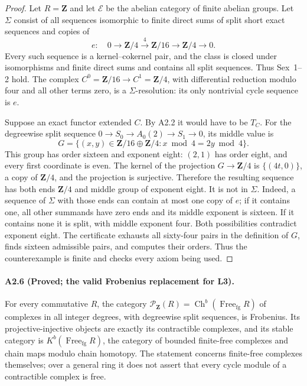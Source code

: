 \begin{proof}
Let $R=\mathbf Z$ and let $\mathcal E$ be the abelian category of
finite abelian groups.  Let $\Sigma$ consist of all sequences
isomorphic to finite direct sums of split short exact sequences and
copies of
\[
 e:\quad 0\longrightarrow\mathbf Z/4\xrightarrow{\,4\,}
 \mathbf Z/16\longrightarrow\mathbf Z/4\longrightarrow0.
\]
Every such sequence is a kernel--cokernel pair, and the class is
closed under isomorphisms and finite direct sums and contains all
split sequences.  Thus Sex~1--2 hold.  The complex
$C^0=\mathbf Z/16\to C^1=\mathbf Z/4$, with differential reduction
modulo four and all other terms zero, is a $\Sigma$-resolution:
its only nontrivial cycle sequence is $e$.

Suppose an exact functor extended $C$.  By A2.2 it would have to be
$T_C$.  For the degreewise split sequence
$0\to S_0\to A_0(2)\to S_1\to0$, its middle value is
\[
 G=\{(x,y)\in\mathbf Z/16\oplus\mathbf Z/4:
                      x\bmod4=2y\bmod4\}.
\]
This group has order sixteen and exponent eight: $(2,1)$ has order
eight, and every first coordinate is even.  The kernel of the
projection $G\to\mathbf Z/4$ is $\{(4t,0)\}$, a copy of
$\mathbf Z/4$, and the projection is surjective.  Therefore the
resulting sequence has both ends $\mathbf Z/4$ and middle group of
exponent eight.  It is not in $\Sigma$.  Indeed, a sequence of
$\Sigma$ with those ends can contain at most one copy of $e$;
if it contains one, all other summands have zero ends and its
middle exponent is sixteen.  If it contains none it is split,
with middle exponent four.  Both possibilities contradict exponent
eight.  The certificate exhausts all sixty-four pairs in the
definition of $G$, finds sixteen admissible pairs, and computes
their orders.  Thus the counterexample is finite and checks every
axiom being used.
\end{proof}

\paragraph{A2.6 (Proved; the valid Frobenius replacement for L3).}
\label{A2.6}
For every commutative $R$, the category
$\mathcal P_{\mathbf Z}(R)=\operatorname{Ch}^b
(\operatorname{Free}_{\mathrm{fg}}R)$ of complexes in all integer
degrees, with degreewise split sequences, is Frobenius.  Its
projective-injective objects are exactly its contractible complexes,
and its stable category is
$K^b(\operatorname{Free}_{\mathrm{fg}}R)$, the category of bounded
finite-free complexes and chain maps modulo chain homotopy.
The statement concerns finite-free complexes themselves; over a
general ring it does not assert that every cycle module of a
contractible complex is free.

